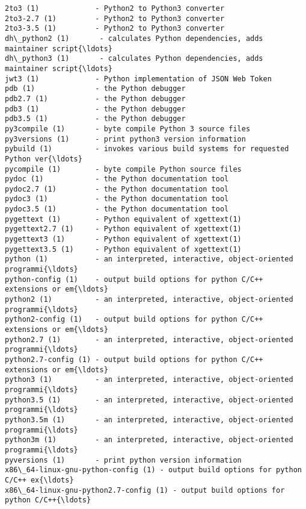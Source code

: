 \documentclass[11pt]{article}
\begin{document}
    \begin{Verbatim}[commandchars=\\\{\}]
2to3 (1)             - Python2 to Python3 converter
2to3-2.7 (1)         - Python2 to Python3 converter
2to3-3.5 (1)         - Python2 to Python3 converter
dh\_python2 (1)       - calculates Python dependencies, adds maintainer script{\ldots}
dh\_python3 (1)       - calculates Python dependencies, adds maintainer script{\ldots}
jwt3 (1)             - Python implementation of JSON Web Token
pdb (1)              - the Python debugger
pdb2.7 (1)           - the Python debugger
pdb3 (1)             - the Python debugger
pdb3.5 (1)           - the Python debugger
py3compile (1)       - byte compile Python 3 source files
py3versions (1)      - print python3 version information
pybuild (1)          - invokes various build systems for requested Python ver{\ldots}
pycompile (1)        - byte compile Python source files
pydoc (1)            - the Python documentation tool
pydoc2.7 (1)         - the Python documentation tool
pydoc3 (1)           - the Python documentation tool
pydoc3.5 (1)         - the Python documentation tool
pygettext (1)        - Python equivalent of xgettext(1)
pygettext2.7 (1)     - Python equivalent of xgettext(1)
pygettext3 (1)       - Python equivalent of xgettext(1)
pygettext3.5 (1)     - Python equivalent of xgettext(1)
python (1)           - an interpreted, interactive, object-oriented programmi{\ldots}
python-config (1)    - output build options for python C/C++ extensions or em{\ldots}
python2 (1)          - an interpreted, interactive, object-oriented programmi{\ldots}
python2-config (1)   - output build options for python C/C++ extensions or em{\ldots}
python2.7 (1)        - an interpreted, interactive, object-oriented programmi{\ldots}
python2.7-config (1) - output build options for python C/C++ extensions or em{\ldots}
python3 (1)          - an interpreted, interactive, object-oriented programmi{\ldots}
python3.5 (1)        - an interpreted, interactive, object-oriented programmi{\ldots}
python3.5m (1)       - an interpreted, interactive, object-oriented programmi{\ldots}
python3m (1)         - an interpreted, interactive, object-oriented programmi{\ldots}
pyversions (1)       - print python version information
x86\_64-linux-gnu-python-config (1) - output build options for python C/C++ ex{\ldots}
x86\_64-linux-gnu-python2.7-config (1) - output build options for python C/C++{\ldots}

    \end{Verbatim}
\end{document}
